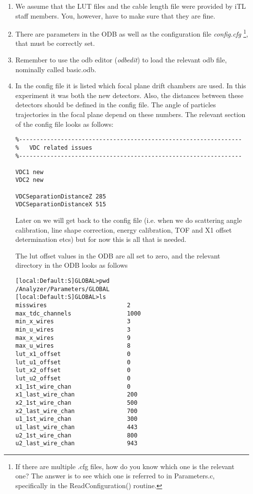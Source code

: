 \documentclass[11pt]{report}
\begin{document}
\begin{enumerate}
\item 
We assume that the LUT files and the cable length file were provided by iTL staff members.
You, however, have to make sure that they are fine. 
\item 
There are parameters in the ODB as well as the configuration file {\it config.cfg} \footnote{If 
there are multiple .cfg files, how do you know which one is the relevant one? The answer
is to see which one is referred to in Parameters.c, specifically in the ReadConfiguration() routine.},
that must be correctly set. 
\item
Remember to use the odb editor ({\it odbedit}) to load the relevant odb file, nominally called basic.odb.
\item
In the config file it is listed which focal plane drift chambers are used. In this experiment 
it was both the new detectors.
Also, the distances between these detectors should be defined in the config file.
The angle of particles trajectories in the focal plane depend on these numbers.
%
The relevant section  of the config file looks as follows:

\begin{verbatim}
%----------------------------------------------------------------
% 	VDC related issues
%----------------------------------------------------------------

VDC1 new
VDC2 new

VDCSeparationDistanceZ 285
VDCSeparationDistanceX 515

\end{verbatim}

Later on we will get back to the config file
(i.e. when we do scattering angle calibration, line shape correction, energy calibration, TOF and X1
offset determination etcs) 
but for now this is all that is needed.

The lut offset values in the ODB are all set to zero, and
the relevant directory in the ODB looks as follows
\begin{verbatim}
[local:Default:S]GLOBAL>pwd  
/Analyzer/Parameters/GLOBAL
[local:Default:S]GLOBAL>ls
misswires                       2
max_tdc_channels                1000
min_x_wires                     3
min_u_wires                     3
max_x_wires                     9
max_u_wires                     8
lut_x1_offset                   0
lut_u1_offset                   0
lut_x2_offset                   0
lut_u2_offset                   0
x1_1st_wire_chan                0
x1_last_wire_chan               200
x2_1st_wire_chan                500
x2_last_wire_chan               700
u1_1st_wire_chan                300
u1_last_wire_chan               443
u2_1st_wire_chan                800
u2_last_wire_chan               943
\end{verbatim}


\end{enumerate}
\end{document}
